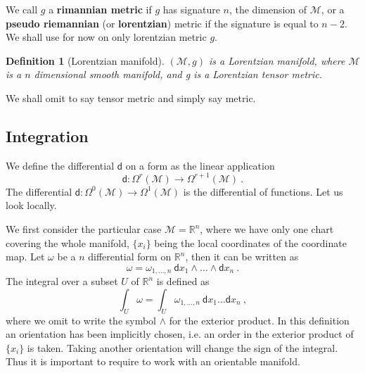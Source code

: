 \documentclass[12pt]{book}
\let\int\int
\newcommand{\Mcal}{\mathcal{M}}
\newcommand{\Rbb}{\mathbb{R}}
\newcommand{\dsf}{\mathsf{d}}
\theoremstyle{break}
\newtheorem{definition}{Definition}
\begin{document}


We call $g$ a \textbf{rimannian metric} if $g$ has signature $n$, the dimension of $\Mcal$, or a \textbf{pseudo riemannian} (or \textbf{lorentzian}) metric if the signature is equal to $n-2$. We shall use for now on only lorentzian metric $g$.


\begin{definition}[Lorentzian manifold]\label{def:lorentzian_M}
$(\Mcal,g)$ is a Lorentzian manifold, where $\Mcal$ is a $n$ dimensional smooth manifold, and g is a Lorentzian tensor metric.
\end{definition}


We shall omit to say tensor metric and simply say metric.


\subsection{Integration}


We define the differential $\dsf$ on a form as the linear application
%
\begin{equation*}
\dsf : \Omega^r(\Mcal) \to \Omega^{r+1}(\Mcal) \ .
\end{equation*}
%
The differential $\dsf : \Omega^0(\Mcal) \to \Omega^1(\Mcal)$ is the differential of functions. Let us look locally. 




We first consider the particular case $\Mcal=\Rbb^n$, where we have only one chart covering the whole manifold, $\{x_i\}$ being the local coordinates of the coordinate map. Let $\omega$ be a $n$ differential form on $\Rbb^n$, then it can be written as
%
\begin{equation*}
\omega = \omega_{1,\dots,n} \ \dsf x_{1} \wedge \dots \wedge \dsf x_{n} \ .
\end{equation*}
%
The integral over a subset $U$ of $\Rbb^n$ is defined as 
%
\begin{equation*}
\int_U \omega = \int_U \omega_{1,\dots,n} \ \dsf x_{1} \dots \dsf x_{n} \ ,
\end{equation*}
%
where we omit to write the symbol $\wedge$ for the exterior product.
%
In this definition an orientation has been implicitly chosen, i.e. an order in the exterior product of $\{x_i\}$ is taken. Taking another orientation will change the sign of the integral. Thus it is important to require to work with an orientable manifold.
\end{document}
